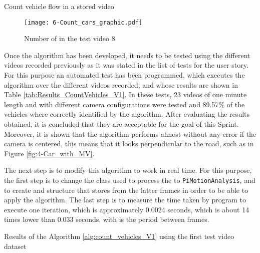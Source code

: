 \begin{algorithm}
{{{			}
		}	
	}
	\caption{Count vehicle flow in a stored video}\label{alg:count_vehicles_V1}
\end{algorithm}\DecMargin{1em}

\begin{figure}[!h]
	\begin{center}
		\texttt{[image: 6-Count\_cars\_graphic.pdf]}
		\caption{Number of  in the test video 8}
		\label{fig:6-Count_cars_graphic}
	\end{center}
\end{figure}

Once the algorithm has been developed, it needs to be tested using the different videos recorded previously as it was stated in the list of tests for the user story. For this purpose an automated test has been programmed, which executes the algorithm over the different videos recorded, and whose results are shown in Table \ref{tab:Results_CountVehicles_V1}. In these tests, 23 videos of one minute length and with different camera configurations were tested and 89.57\% of the vehicles where correctly identified by the algorithm. After evaluating the results obtained, it is concluded that they are acceptable for the goal of this Sprint. Moreover, it is shown that the algorithm performs almost without any error if the camera is centered, this means that it looks perpendicular to the road, such as in Figure \ref{fig:4-Car_with_MV}. 

The next step is to modify this algorithm to work in real time. For this purpose, the first step is to change the class used to process the  to \texttt{PiMotionAnalysis}, and to create and structure that stores  from the latter frames in order to be able to apply the algorithm. The last step is to measure the time taken by program to execute one iteration, which is approximately 0.0024 seconds, which is about 14 times lower than 0.033 seconds, with is the period between frames.

\begin{table}[!h]
	\centering
	{\small
		
	}
	\caption{Results of the Algorithm \ref{alg:count_vehicles_V1} using the first test video dataset}
	\label{tab:Results_CountVehicles_V1}
\end{table}


\newpage
